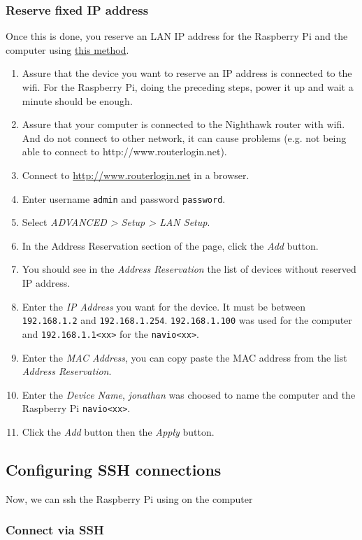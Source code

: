 \subsubsection{Reserve fixed IP address}
Once this is done, you reserve an LAN IP address for the Raspberry Pi and the computer using \href{https://kb.netgear.com/24091/How-do-I-reserve-a-LAN-IP-address-on-my-Nighthawk-router}{this method}.
\begin{enumerate}
    \item Assure that the device you want to reserve an IP address is connected to the wifi. For the Raspberry Pi, doing the preceding steps, power it up and wait a minute should be enough.
    \item Assure that your computer is connected to the Nighthawk router with wifi. And do not connect to other network, it can cause problems (e.g. not being able to connect to http://www.routerlogin.net).
    \item Connect to \url{http://www.routerlogin.net} in a browser.
    \item Enter username \texttt{admin} and password \texttt{password}.
    \item Select \emph{ADVANCED > Setup > LAN Setup}.
    \item In the Address Reservation section of the page, click the \emph{Add} button.
    \item You should see in the \emph{Address Reservation} the list of devices without reserved IP address.
    \item Enter the \emph{IP Address} you want for the device. It must be between \texttt{192.168.1.2} and \texttt{192.168.1.254}. \texttt{192.168.1.100} was used for the computer and \texttt{192.168.1.1<xx>} for the \texttt{navio<xx>}.
    \item Enter the \emph{MAC Address}, you can copy paste the MAC address from the list \emph{Address Reservation}.
    \item Enter the \emph{Device Name}, \emph{jonathan} was choosed to name the computer and the Raspberry Pi \texttt{navio<xx>}.
    \item Click the \emph{Add} button then the \emph{Apply} button.
\end{enumerate}

\subsection{Configuring SSH connections}
Now, we can ssh the Raspberry Pi using on the computer
\subsubsection{Connect via SSH}


